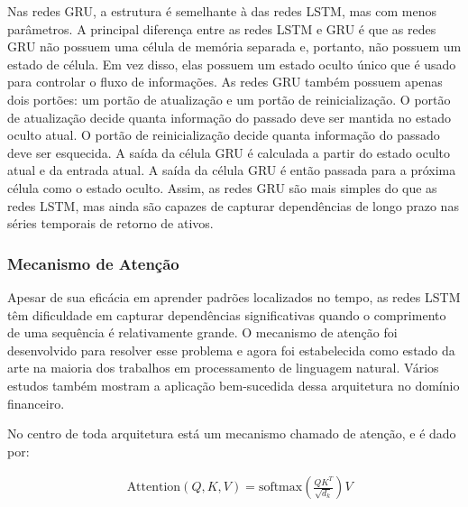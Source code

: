             \ipar Nas redes \acrshort{GRU}, a estrutura é semelhante à das redes \acrshort{LSTM}, mas com menos parâmetros. A principal diferença entre as redes \acrshort{LSTM} e \acrshort{GRU} é que as redes \acrshort{GRU} não possuem uma célula de memória separada e, portanto, não possuem um estado de célula. Em vez disso, elas possuem um estado oculto único que é usado para controlar o fluxo de informações. As redes \acrshort{GRU} também possuem apenas dois portões: um portão de atualização e um portão de reinicialização. O portão de atualização decide quanta informação do passado deve ser mantida no estado oculto atual. O portão de reinicialização decide quanta informação do passado deve ser esquecida. A saída da célula \acrshort{GRU} é calculada a partir do estado oculto atual e da entrada atual. A saída da célula \acrshort{GRU} é então passada para a próxima célula como o estado oculto. Assim, as redes \acrshort{GRU} são mais simples do que as redes \acrshort{LSTM}, mas ainda são capazes de capturar dependências de longo prazo nas séries temporais de retorno de ativos.
        
        \subsubsection{Mecanismo de Atenção}
        
            \ipar Apesar de sua eficácia em aprender padrões localizados no tempo, as redes \acrshort{LSTM} têm dificuldade em capturar dependências significativas quando o comprimento de uma sequência é relativamente grande. O mecanismo de atenção foi desenvolvido para resolver esse problema e agora foi estabelecida como estado da arte na maioria dos trabalhos em processamento de linguagem natural. Vários estudos também mostram a aplicação bem-sucedida dessa arquitetura no domínio financeiro.             
            
            \ipar No centro de toda arquitetura está um mecanismo chamado de atenção, e é dado por:

            \begin{equation}
                \label{eq:attention}
                \begin{aligned}
                    & \text{Attention}(Q, K, V) = \text{softmax}\left(\frac{QK^T}{\sqrt{d_k}}\right)V \\
                \end{aligned}
            \end{equation}
        
